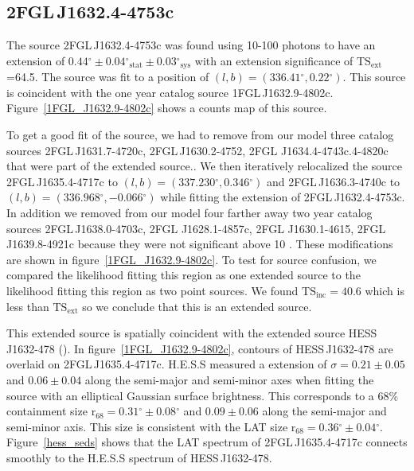 \documentclass[12pt,preprint]{aastex}
\newcommand{\gev}{\text{GeV}\xspace}
\newcommand{\tev}{\text{TeV}\xspace}
\newcommand{\tsext}{{\ensuremath{\text{TS}_{\text{ext}}}}\xspace}
\newcommand{\tsinc}{\ensuremath{\text{TS}_{\text{inc}}}\xspace}
\newcommand{\rsixeight}{{\ensuremath{\text{r}_{68}}}\xspace}
\newcommand{\sys}{\text{sys}\xspace}
\newcommand{\stat}{\text{stat}\xspace}
\renewcommand{\deg}{\ensuremath{^\circ}\xspace}
\begin{document}
\subsection{2FGL\,J1632.4-4753c}
\label{section_2FGL_J1632.4-4753c}



The source 2FGL\,J1632.4-4753c was found 
using 10-100 \gev photons to
have an extension of $0.44\deg\pm0.04\deg_\stat\pm0.03\deg_\sys$ 
with an extension
significance of \tsext=64.5.  The source was fit to a position of
$(l,b)=(336.41\deg,0.22\deg)$.  This source is coincident with the one
year catalog source 1FGL\,J1632.9-4802c.  Figure~\ref{1FGL_J1632.9-4802c}
shows a counts map of this source.

To get a good fit of the source, we had to remove from our model
three catalog sources 2FGL\,J1631.7-4720c, 2FGL\,J1630.2-4752,
2FGL J1634.4-4743c.4-4820c that were part of the extended source..
We then iteratively relocalized the source 2FGL\,J1635.4-4717c
to $(l,b)=(337.230\deg,0.346\deg)$ and 2FGL\,J1636.3-4740c to
$(l,b)=(336.968\deg,-0.066\deg)$ while fitting the extension of
2FGL\,J1632.4-4753c.  In addition we removed from our model four
farther away two year catalog sources 2FGL\,J1638.0-4703c, 2FGL
J1628.1-4857c, 2FGL  J1630.1-4615, 2FGL\,J1639.8-4921c because they
were not significant above 10 \gev.  These modifications are shown
in figure~\ref{1FGL_J1632.9-4802c}.  To test for source confusion,
we compared the likelihood fitting this region as one extended source
to the likelihood fitting this region as two point sources. We found
$\tsinc=40.6$ which is less than \tsext so we conclude
that this is an extended source.

This extended source is spatially coincident with the extended
\tev source HESS\,J1632-478 (\cite{hess_plane_survey}).
In figure~\ref{1FGL_J1632.9-4802c}, contours of  HESS\,J1632-478
are overlaid on 2FGL\,J1635.4-4717c.  H.E.S.S measured a 
extension of $\sigma=0.21\pm0.05$ and $0.06\pm0.04$ along the
semi-major and semi-minor axes when fitting the source with an
elliptical Gaussian surface brightness.  This corresponds to a 68\%
containment size $\rsixeight=0.31\deg\pm0.08\deg$ and $0.09\pm0.06$
along the semi-major and semi-minor axis. This size is consistent with
the LAT size $\rsixeight=0.36\deg\pm0.04\deg$.  Figure~\ref{hess_seds}
shows that the LAT spectrum of 2FGL\,J1635.4-4717c connects smoothly to
the H.E.S.S spectrum of HESS\,J1632-478.
\end{document}
